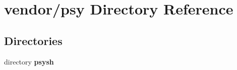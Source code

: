 \section{vendor/psy Directory Reference}
\label{dir_52038f0acc03b23de00f77f28379078b}
\subsection*{Directories}
\begin{DoxyCompactItemize}
\item 
directory {\bf psysh}
\end{DoxyCompactItemize}
